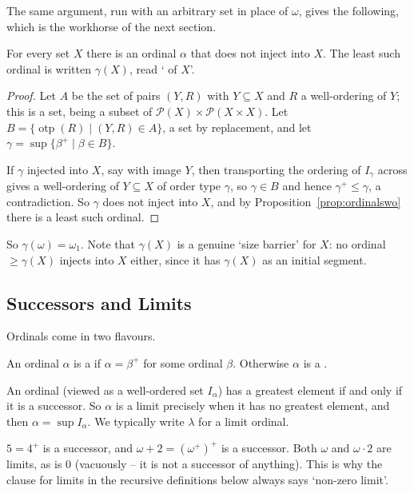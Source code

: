 \documentclass[a4paper]{scrartcl}
\newcommand{\otp}{\operatorname{otp}}
\begin{document}
The same argument, run with an arbitrary set in place of $\omega$, gives the following, which is the workhorse of the next section.

\begin{theorem}\label{thm:hartogs}
  For every set $X$ there is an ordinal $\alpha$ that does not inject into $X$. The least such ordinal is written $\gamma(X)$, read ` of $X$'.
\end{theorem}
\begin{proof}
  Let $A$ be the set of pairs $(Y, R)$ with $Y \subseteq X$ and $R$ a well-ordering of $Y$; this is a set, being a subset of $\mathcal{P}(X) \times \mathcal{P}(X \times X)$. Let $B = \{\otp(R) \mid (Y, R) \in A\}$, a set by replacement, and let $\gamma = \sup\{\beta^+ \mid \beta \in B\}$.

  If $\gamma$ injected into $X$, say with image $Y$, then transporting the ordering of $I_\gamma$ across gives a well-ordering of $Y \subseteq X$ of order type $\gamma$, so $\gamma \in B$ and hence $\gamma^+ \leq \gamma$, a contradiction. So $\gamma$ does not inject into $X$, and by Proposition~\ref{prop:ordinalswo} there is a least such ordinal.
\end{proof}

So $\gamma(\omega) = \omega_1$. Note that $\gamma(X)$ is a genuine `size barrier' for $X$: no ordinal $\geq \gamma(X)$ injects into $X$ either, since it has $\gamma(X)$ as an initial segment.

\subsection{Successors and Limits}

Ordinals come in two flavours.

\begin{definition}
  An ordinal $\alpha$ is a  if $\alpha = \beta^+$ for some ordinal $\beta$. Otherwise $\alpha$ is a .
\end{definition}

An ordinal (viewed as a well-ordered set $I_\alpha$) has a greatest element if and only if it is a successor. So $\alpha$ is a limit precisely when it has no greatest element, and then $\alpha = \sup I_\alpha$. We typically write $\lambda$ for a limit ordinal.

\begin{example}
  $5 = 4^+$ is a successor, and $\omega + 2 = (\omega^+)^+$ is a successor. Both $\omega$ and $\omega \cdot 2$ are limits, as is $0$ (vacuously -- it is not a successor of anything). This is why the clause for limits in the recursive definitions below always says `non-zero limit'.
\end{example}
\end{document}
